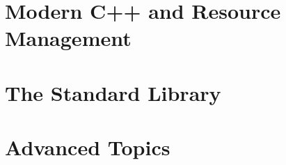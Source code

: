 \documentclass[12pt,letterpaper]{article}
\theoremstyle{definition}
\theoremstyle{remark}
\begin{document}
	
	\newpage

	\part{Modern C++ and Resource Management}

	
	\newpage

	
	\newpage

	\part{The Standard Library}

	
	\newpage

	
	\newpage

	
	\newpage

	\part{Advanced Topics}

	
	\newpage

	
	\newpage

	
	\newpage

	
	\newpage

	
	\newpage

	
	
\end{document}
